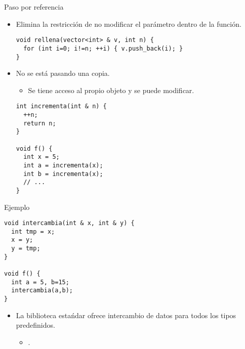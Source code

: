 \begin{frame}[fragile]{Paso por referencia}
\begin{itemize}
  \item Elimina la restricción de no modificar el parámetro dentro de la función.
\begin{lstlisting}
void rellena(vector<int> & v, int n) {
  for (int i=0; i!=n; ++i) { v.push_back(i); }
}
\end{lstlisting}
  \item No se está pasando una copia.
    \begin{itemize}
      \item Se tiene acceso al propio objeto y se puede modificar.
    \end{itemize}
\begin{lstlisting}
int incrementa(int & n) {
  ++n;
  return n;
}

void f() {
  int x = 5;
  int a = incrementa(x);
  int b = incrementa(x);
  // ...
}
\end{lstlisting}
\end{itemize}
\end{frame}

\begin{frame}[fragile]{Ejemplo}
\begin{lstlisting}
void intercambia(int & x, int & y) {
  int tmp = x;
  x = y;
  y = tmp;
}

void f() {
  int a = 5, b=15;
  intercambia(a,b);
}
\end{lstlisting}
\begin{itemize}
  \item La biblioteca estańdar ofrece intercambio de datos para todos los tipos predefinidos.
    \begin{itemize}
      \item {}.
    \end{itemize}
\end{itemize}
\end{frame}
